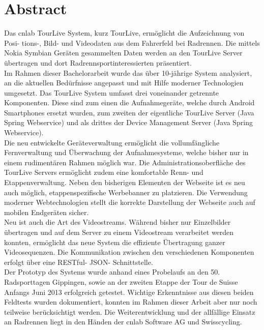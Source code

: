 \chapter*{Abstract}
Das cnlab TourLive System, kurz TourLive, ermöglicht die Aufzeichnung von Posi- tions-, Bild- und Videodaten aus dem Fahrerfeld bei Radrennen. Die mittels Nokia Symbian Geräten gesammelten Daten werden an den TourLive Server übertragen und dort Radrennsportinteressierten präsentiert.
\\

Im Rahmen dieser Bachelorarbeit wurde das über 10-jährige System analysiert, an die aktuellen Bedürfnisse angepasst und mit Hilfe moderner Technologien umgesetzt. Das TourLive System umfasst drei voneinander getrennte Komponenten. Diese sind zum einen die Aufnahmegeräte, welche durch Android Smartphones ersetzt wurden, zum zweiten der eigentliche TourLive Server (Java Spring Webservice) und als drittes der Device Management Server (Java Spring Webservice). 
\\

Die neu entwickelte Geräteverwaltung ermöglicht die vollumfängliche Fernverwaltung und Überwachung der Aufnahmesysteme, welche bisher nur in einem rudimentären Rahmen möglich war. Die Administrationsoberfläche des TourLive Servers ermöglicht zudem eine komfortable Renn- und Etappenverwaltung. Neben den bisherigen Elementen der Webseite ist es neu auch möglich, etappenspezifische Werbebanner zu platzieren. Die Verwendung moderner Webtechnologien stellt die korrekte Darstellung der Webseite auch auf mobilen Endgeräten sicher.
\\

Neu ist auch die Art des Videostreams. Während bisher nur Einzelbilder übertragen und auf dem Server zu einem Videostream verarbeitet werden konnten, ermöglicht das neue System die effiziente Übertragung ganzer Videosequenzen. Die Kommunikation zwischen den verschiedenen Komponenten erfolgt über eine RESTful- JSON- Schnittstelle. 
\\

Der Prototyp des Systems wurde anhand eines Probelaufs an den 50. Radsporttagen Gippingen, sowie an der zweiten Etappe der Tour de Suisse Anfangs Juni 2013 erfolgreich getestet. Wichtige Erkenntnisse aus diesen beiden Feldtests wurden dokumentiert, konnten im Rahmen dieser Arbeit aber nur noch teilweise berücksichtigt werden. Die Weiterentwicklung und der allfällige Einsatz an Radrennen liegt in den Händen der cnlab Software AG und Swisscycling.
